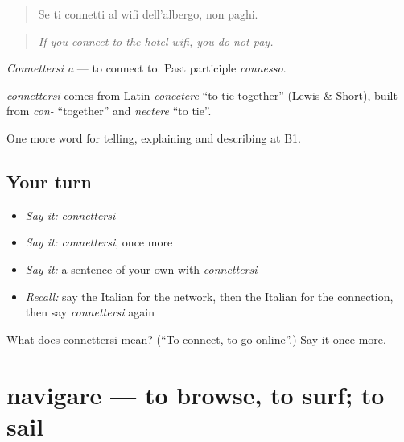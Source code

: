 \begin{quote}
Se ti connetti al wifi dell'albergo, non paghi.
\end{quote}

\begin{quote}
\emph{If you connect to the hotel wifi, you do not pay.}
\end{quote}

\emph{Connettersi a} — to connect to. Past participle \emph{connesso}.

\begin{cousinweb}
\emph{connettersi} comes from Latin \emph{cōnectere} \textquotedblleft{}to tie together\textquotedblright{} (Lewis \& Short), built from \emph{con-} \textquotedblleft{}together\textquotedblright{} and \emph{nectere} \textquotedblleft{}to tie\textquotedblright{}.
\end{cousinweb}

\begin{grammarlens}[title={What you've built}]
One more word for telling, explaining and describing at B1.
\end{grammarlens}

\subsection*{Your turn}
\begin{itemize}
\raggedright
  \item \emph{Say it:} \emph{connettersi}
  \item \emph{Say it:} \emph{connettersi}, once more
  \item \emph{Say it:} a sentence of your own with \emph{connettersi}
  \item \emph{Recall:} say the Italian for the network, then the Italian for the connection, then say \emph{connettersi} again
\end{itemize}

\begin{tcolorbox}[breakable,colback=teal!4,colframe=teal!35!black,title={Before you move on}]
What does connettersi mean? (\textquotedblleft{}To connect, to go online\textquotedblright{}.) Say it once more.
\end{tcolorbox}
\section[navigare]{navigare — to browse, to surf; to sail}

\label{lesson:IT-C402-navigare}




